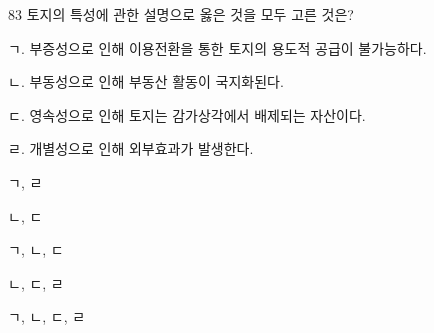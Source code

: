 \begin{question}{83}
토지의 특성에 관한 설명으로 옳은 것을 모두 고른 것은?
\begin{framedtext}
ㄱ. 부증성으로 인해 이용전환을 통한 토지의 용도적 공급이 불가능하다. \par
ㄴ. 부동성으로 인해 부동산 활동이 국지화된다. \par
ㄷ. 영속성으로 인해 토지는 감가상각에서 배제되는 자산이다. \par
ㄹ. 개별성으로 인해 외부효과가 발생한다. \par
\end{framedtext}
\begin{choices}
  \item ㄱ, ㄹ
  \item ㄴ, ㄷ
  \item ㄱ, ㄴ, ㄷ
  \item ㄴ, ㄷ, ㄹ
  \item ㄱ, ㄴ, ㄷ, ㄹ
\end{choices}
\end{question}
